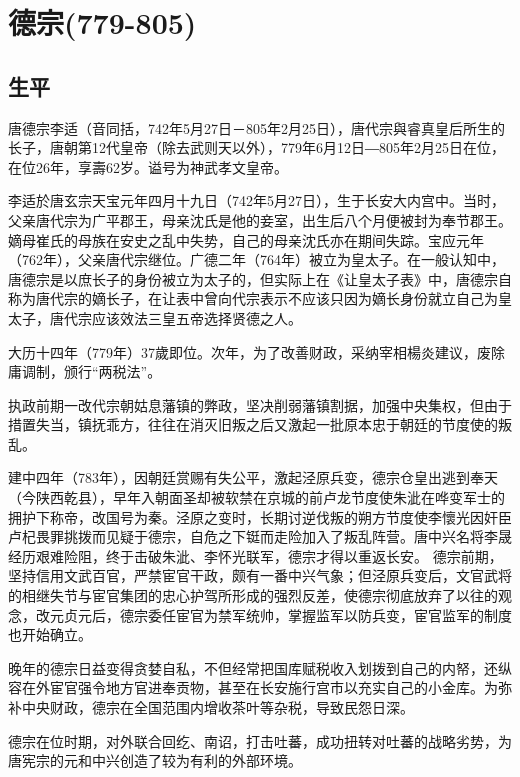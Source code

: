 
\section{德宗\tiny(779-805)}

\subsection{生平}

唐德宗李适（音同括，742年5月27日－805年2月25日），唐代宗與睿真皇后所生的长子，唐朝第12代皇帝（除去武则天以外），779年6月12日―805年2月25日在位，在位26年，享壽62岁。谥号为神武孝文皇帝。

李适於唐玄宗天宝元年四月十九日（742年5月27日），生于长安大内宫中。当时，父亲唐代宗为广平郡王，母亲沈氏是他的妾室，出生后八个月便被封为奉节郡王。嫡母崔氏的母族在安史之乱中失势，自己的母亲沈氏亦在期间失踪。宝应元年（762年），父亲唐代宗继位。广德二年（764年）被立为皇太子。在一般认知中，唐德宗是以庶长子的身份被立为太子的，但实际上在《让皇太子表》中，唐德宗自称为唐代宗的嫡长子，在让表中曾向代宗表示不应该只因为嫡长身份就立自己为皇太子，唐代宗应该效法三皇五帝选择贤德之人。

大历十四年（779年）37歲即位。次年，为了改善财政，采纳宰相楊炎建议，废除庸调制，颁行“两税法”。

执政前期一改代宗朝姑息藩镇的弊政，坚决削弱藩镇割据，加强中央集权，但由于措置失当，镇抚乖方，往往在消灭旧叛之后又激起一批原本忠于朝廷的节度使的叛乱。

建中四年（783年），因朝廷赏赐有失公平，激起泾原兵变，德宗仓皇出逃到奉天（今陕西乾县），早年入朝面圣却被软禁在京城的前卢龙节度使朱泚在哗变军士的拥护下称帝，改国号为秦。泾原之变时，长期讨逆伐叛的朔方节度使李懷光因奸臣卢杞畏罪挑拨而见疑于德宗，自危之下铤而走险加入了叛乱阵营。唐中兴名将李晟经历艰难险阻，终于击破朱泚、李怀光联军，德宗才得以重返长安。 德宗前期，坚持信用文武百官，严禁宦官干政，颇有一番中兴气象；但泾原兵变后，文官武将的相继失节与宦官集团的忠心护驾所形成的强烈反差，使德宗彻底放弃了以往的观念，改元贞元后，德宗委任宦官为禁军统帅，掌握监军以防兵变，宦官监军的制度也开始确立。

晚年的德宗日益变得贪婪自私，不但经常把国库赋税收入划拨到自己的内帑，还纵容在外宦官强令地方官进奉贡物，甚至在长安施行宫市以充实自己的小金库。为弥补中央财政，德宗在全国范围内增收茶叶等杂税，导致民怨日深。

德宗在位时期，对外联合回纥、南诏，打击吐蕃，成功扭转对吐蕃的战略劣势，为唐宪宗的元和中兴创造了较为有利的外部环境。

